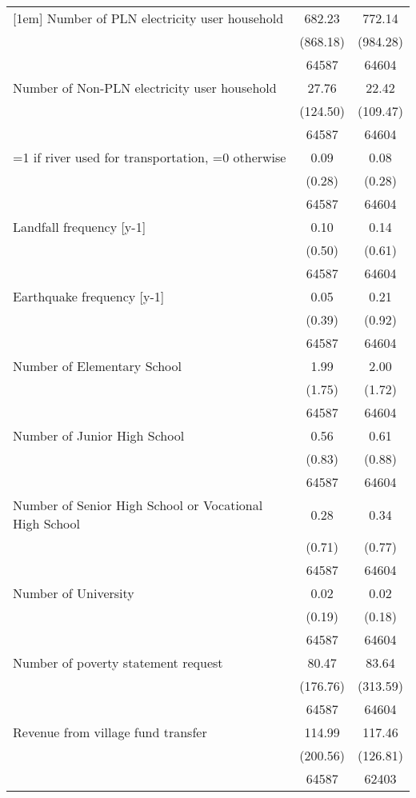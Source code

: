 \begin{tabular}{l*{2}{c}}
[1em]
Number of PLN electricity user household&      682.23&      772.14\\
                    &    (868.18)&    (984.28)\\
                    &       64587&       64604\\
[1em]
Number of Non-PLN electricity user household&       27.76&       22.42\\
                    &    (124.50)&    (109.47)\\
                    &       64587&       64604\\
[1em]
=1 if river used for transportation, =0 otherwise&        0.09&        0.08\\
                    &      (0.28)&      (0.28)\\
                    &       64587&       64604\\
[1em]
Landfall frequency [y-1]&        0.10&        0.14\\
                    &      (0.50)&      (0.61)\\
                    &       64587&       64604\\
[1em]
Earthquake frequency [y-1]&        0.05&        0.21\\
                    &      (0.39)&      (0.92)\\
                    &       64587&       64604\\
[1em]
Number of Elementary School&        1.99&        2.00\\
                    &      (1.75)&      (1.72)\\
                    &       64587&       64604\\
[1em]
Number of Junior High School&        0.56&        0.61\\
                    &      (0.83)&      (0.88)\\
                    &       64587&       64604\\
[1em]
Number of Senior High School or Vocational High School&        0.28&        0.34\\
                    &      (0.71)&      (0.77)\\
                    &       64587&       64604\\
[1em]
Number of University&        0.02&        0.02\\
                    &      (0.19)&      (0.18)\\
                    &       64587&       64604\\
[1em]
Number of poverty statement request&       80.47&       83.64\\
                    &    (176.76)&    (313.59)\\
                    &       64587&       64604\\
[1em]
Revenue from village fund transfer&      114.99&      117.46\\
                    &    (200.56)&    (126.81)\\
                    &       64587&       62403\\
\hline\hline
\end{tabular}
